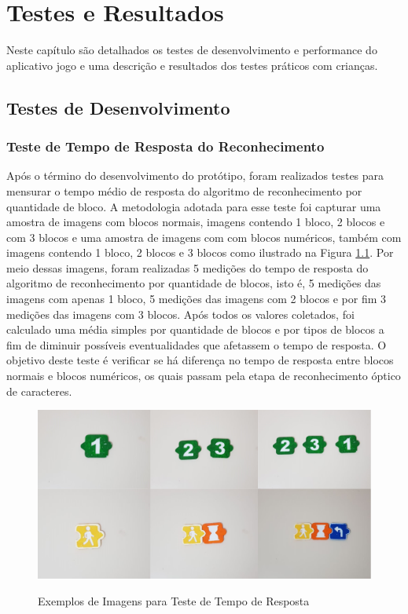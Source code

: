 \chapter{Testes e Resultados}\label{cap:conclusão}
Neste capítulo são detalhados os testes de desenvolvimento e performance do aplicativo jogo e uma descrição e resultados dos testes práticos com crianças.

\section{Testes de Desenvolvimento}


\subsection{\textbf{Teste de Tempo de Resposta do Reconhecimento}}

Após o término do desenvolvimento do protótipo, foram realizados testes para mensurar o tempo médio de resposta do algoritmo de reconhecimento por quantidade de bloco. A metodologia adotada para esse teste foi capturar uma amostra de imagens com blocos normais, imagens contendo 1 bloco, 2 blocos e com 3 blocos e uma amostra de imagens com com blocos numéricos, também com imagens contendo 1 bloco, 2 blocos e 3 blocos como ilustrado na Figura \ref{figura:ttr}. Por meio dessas imagens, foram realizadas 5 medições do tempo de resposta do algoritmo de reconhecimento por quantidade de blocos, isto é, 5 medições das imagens com apenas 1 bloco, 5 medições das imagens com 2 blocos e por fim 3 medições das imagens com 3 blocos. Após todos os valores coletados, foi calculado uma média simples por quantidade de blocos e por tipos de blocos a fim de diminuir possíveis eventualidades que afetassem o tempo de resposta. O objetivo deste teste é verificar se há diferença no tempo de resposta entre blocos normais e blocos numéricos, os quais passam pela etapa de reconhecimento óptico de caracteres.

\begin{figure}[H]
    \caption{Exemplos de Imagens para Teste de Tempo de Resposta}
    \centering
    \includegraphics[width=15cm]{Imagens/Cap5/ttr.png}
    \label{figura:ttr}
\end{figure}

